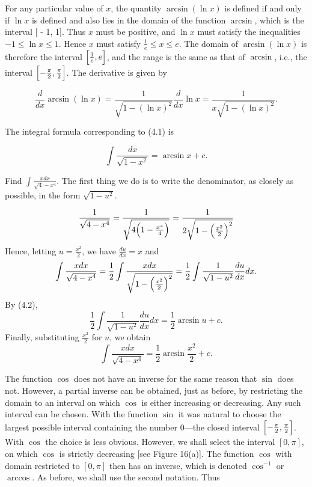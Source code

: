 For any particular value of $x$, the quantity $\arcsin(\ln x)$ is defined if and only if $\ln x$ is defined and also lies in the domain of the function $\arcsin$, which is the interval [ - 1, 1].  Thus $x$ must be positive, and $\ln x$ must satisfy the inequalities $-1 \leq \ln x \leq 1$. Hence $x$ must satisfy $\frac{1}{e} \leq x \leq e$.  The domain of $\arcsin (\ln x)$ is therefore the interval $\Bigl[\frac{1}{e}, e\Bigr]$, and the range is the same as that of $\arcsin$, i.e., the interval $\Bigl[ -\frac{\pi}{2}, \frac{\pi}{2} \Bigr]$. The derivative is given by

$$
\frac{d}{dx} \arcsin(\ln x) = \frac{1}{\sqrt {1 - (\ln x)^2}} \frac{d}{dx} \ln x 
=  \frac{1}{x \sqrt{1 - (\ln x)^2}} .
$$

The integral formula corresponding to (4.1) is

\begin{theorem} %
$$
\int \frac{dx}{\sqrt {1 - x^2}}  = \arcsin x + c.  
$$
\end{theorem}

\begin{example}
Find $\int \frac{x dx}{\sqrt 4 - x^4}$. The first thing we do is to write the denominator, as closely as possible, in the form $\sqrt {1 - u^2}$. 

$$
 \frac{1}{\sqrt{4 - x^4}} = \frac{1}{\sqrt{4 \Bigl(1 - \frac{x^4}{4}\Bigr)}} = \frac{1}{2 \sqrt {1 - \Bigl(\frac{x^2}{2}\Bigr)^2}}
$$
Hence, letting $u = \frac{x^2}{2}$, we have $\frac{du}{dx} = x$ and 
$$
\int \frac{x dx}{\sqrt{4 - x^4}} 
= \frac{1}{2} \int \frac{x dx}{\sqrt {1 - \Bigl(\frac{x^2}{2}\Bigr)^2} } 
= \frac{1}{2} \int \frac{1}{\sqrt{1 - u^2}} \frac {du}{dx} dx .
$$
By (4.2), 
$$
\frac{1}{2} \int \frac{1}{\sqrt {1 - u^2}} \frac{du}{dx} dx  = \frac{1}{2} \arcsin u + c. 
$$
Finally, substituting $\frac{x^2}{2}$ for $u$, we obtain
$$
\int \frac{xdx}{\sqrt {4 - x^4}} = \frac{1}{2} \arcsin \frac{x^2}{2} + c.
$$
\end{example}


The function $\cos$ does not have an inverse for the same reason that $\sin$ does not. However, a partial inverse can be obtained, just as before, by restricting the domain to an interval on which $\cos$ is either increasing or decreasing. Any such interval can be chosen. With the function $\sin$ it was natural to choose the largest possible interval containing the number 0---the closed interval $\Bigl[ -\frac{\pi}{2}, \frac{\pi}{2}\Bigr]$. With $\cos$ the choice is less obvious. However, we shall select the interval $[0, \pi]$, on which $\cos$ is strictly decreasing [see Figure 16(a)]. The function $\cos$ with domain restricted to $[0, \pi]$ then has an inverse, which is denoted $\cos^{-1}$ or $\arccos$. As before, we shall use the second notation. Thus

